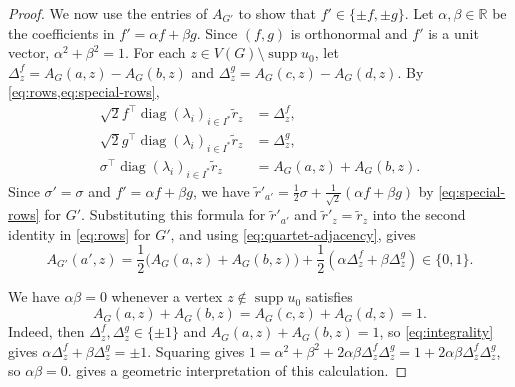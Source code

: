 \documentclass[10pt,a4paper]{article}
\theoremstyle{plain}
\theoremstyle{definition}
\DeclareMathOperator{\supp}{supp}
\DeclareMathOperator{\diag}{diag}
\newcommand{\R}{\mathbb{R}}
\begin{document}
\begin{proof}
  We now use the entries of $A_{G'}$ to show that $f'\in\{\pm f,\pm g\}$.
  Let $\alpha,\beta\in\R$ be the coefficients in $f'=\alpha f+\beta g$.
  Since $(f,g)$ is orthonormal and $f'$ is a unit vector,
  $\alpha^2+\beta^2=1$.
  For each $z\in V(G)\setminus\supp u_0$, let
  $\Delta_z^f=A_G(a,z)-A_G(b,z)$ and
  $\Delta_z^g=A_G(c,z)-A_G(d,z)$.
  By \cref{eq:rows,eq:special-rows},
  \begin{equation}\label{eq:quartet-adjacency}
    \begin{aligned}
      \sqrt2 f^{\top}\diag(\lambda_i)_{i\in I^*}\tilde{r}_z &= \Delta_z^f,\\
      \sqrt2 g^{\top}\diag(\lambda_i)_{i\in I^*}\tilde{r}_z &= \Delta_z^g,\\
      \sigma^{\top}\diag(\lambda_i)_{i\in I^*}\tilde{r}_z &= A_G(a,z)+A_G(b,z).
    \end{aligned}
  \end{equation}
  Since $\sigma'=\sigma$ and $f'=\alpha f+\beta g$, we have
  $\tilde{r}'_{a'}=\tfrac12\sigma+\tfrac1{\sqrt2}(\alpha f+\beta g)$
  by \cref{eq:special-rows} for $G'$.
  Substituting this formula for $\tilde{r}'_{a'}$ and $\tilde{r}'_z=\tilde{r}_z$ into
  the second identity in \cref{eq:rows} for $G'$, and using
  \cref{eq:quartet-adjacency}, gives
  \begin{equation}
    \label{eq:integrality}
    A_{G'}(a', z) = \frac{1}{2}\bigl(A_G(a,z)+A_G(b,z)\bigr)
      + \frac{1}{2}(\alpha\Delta_z^f+\beta\Delta_z^g)\in\{0,1\}.
  \end{equation}

  We have $\alpha\beta=0$ whenever a vertex $z\notin\supp u_0$ satisfies
  \begin{equation}\label{eq:quartet-probe}
    A_G(a,z)+A_G(b,z)=A_G(c,z)+A_G(d,z)=1.
  \end{equation}
  Indeed, then $\Delta_z^f,\Delta_z^g\in\{\pm1\}$ and
  $A_G(a,z)+A_G(b,z)=1$, so \cref{eq:integrality} gives
  $\alpha\Delta_z^f+\beta\Delta_z^g=\pm1$.
  Squaring gives
  $1=\alpha^2+\beta^2+2\alpha\beta\Delta_z^f\Delta_z^g
  =1+2\alpha\beta\Delta_z^f\Delta_z^g$, so $\alpha\beta=0$.
   gives a geometric interpretation of this calculation.


\end{proof}
\end{document}
